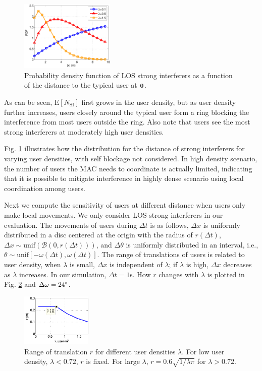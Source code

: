 \documentclass[10pt, conference, letterpaper]{IEEEtran}
\begin{document}
\begin{figure}
	\centering
	\includegraphics[width = 0.4\textwidth]{Channel_si_pdf.pdf}
	\caption{Probability density function of LOS strong interferers as a function of the distance to the typical user at $\bf{0}$.}
	\label{fig:Channel_si_pdf}
\end{figure}

As can be seen, $\mathrm{E}[N_{\mathrm{SI}}]$ first grows in the user density, but as user density further increases, users closely around the typical user form a ring blocking the interference from most users outside the ring. Also note that users see the most strong interferers at moderately high user densities. 

Fig. \ref{fig:Channel_si_pdf} illustrates how the distribution for the distance of strong interferers for varying user densities, with self blockage not considered. In high density scenario, the number of users the MAC needs to coordinate is actually limited, indicating that it is possible to mitigate interference in highly dense scenario using local coordination among users.

Next we compute the sensitivity of users at different distance when users only make local movements. We only consider LOS strong interferers in our evaluation. The movements of users during $\Delta t$ is as follows, $\Delta x$ is uniformly distributed in a disc centered at the origin with the radius of $r(\Delta t)$, $\Delta x \sim \mathrm{unif}(\mathcal{B}(0, r(\Delta t)))$, and $\Delta \theta$ is uniformly distributed in an interval, i.e., $\theta \sim \mathrm{unif}[-\omega(\Delta t), \omega(\Delta t)]$. The range of translations of users is related to user density, when $\lambda$ is small, $\Delta x$ is independent of $\lambda$; if $\lambda$ is high, $\Delta x$ decreases as $\lambda$ increases. In our simulation, $\Delta t = 1$s. How $r$ changes with $\lambda$ is plotted in Fig. \ref{fig:Channel_translation_range} and $\Delta \omega = 24\degree$.

\begin{figure}
	\centering
	\includegraphics[width = 0.3\textwidth]{Channel_translation_range.pdf}
	\caption{Range of translation $r$ for different user densities $\lambda$. For low user density, $\lambda<0.72$, $r$ is fixed. For large $\lambda$, $r = 0.6 \sqrt{1/\lambda\pi}$ for $\lambda >0.72$.}
	\label{fig:Channel_translation_range}
\end{figure}
\end{document}
